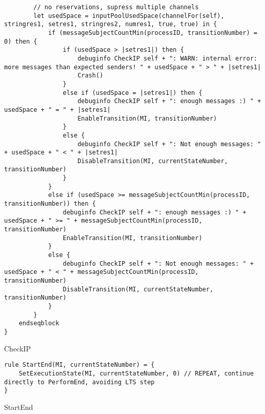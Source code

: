 \begin{listing}[H]
\begin{verbatim}
        // no reservations, supress multiple channels
        let usedSpace = inputPoolUsedSpace(channelFor(self), stringres1, setres1, stringres2, numres1, true, true) in {
            if (messageSubjectCountMin(processID, transitionNumber) = 0) then {
                if (usedSpace > |setres1|) then {
                    debuginfo CheckIP self + ": WARN: internal error: more messages than expected senders! " + usedSpace + " > " + |setres1|
                    Crash()
                }
                else if (usedSpace = |setres1|) then {
                    debuginfo CheckIP self + ": enough messages :) " + usedSpace + " = " + |setres1|
                    EnableTransition(MI, transitionNumber)
                }
                else {
                    debuginfo CheckIP self + ": Not enough messages: " + usedSpace + " < " + |setres1|
                    DisableTransition(MI, currentStateNumber, transitionNumber)
                }
            }
            else if (usedSpace >= messageSubjectCountMin(processID, transitionNumber)) then {
                debuginfo CheckIP self + ": enough messages :) " + usedSpace + " >= " + messageSubjectCountMin(processID, transitionNumber)
                EnableTransition(MI, transitionNumber)
            }
            else {
                debuginfo CheckIP self + ": Not enough messages: " + usedSpace + " < " + messageSubjectCountMin(processID, transitionNumber)
                DisableTransition(MI, currentStateNumber, transitionNumber)
            }
        }
    endseqblock
}
\end{verbatim}
\caption{CheckIP}
\label{lst:asm:CheckIP}
\end{listing}





\begin{listing}[H]
\begin{verbatim}
rule StartEnd(MI, currentStateNumber) = {
    SetExecutionState(MI, currentStateNumber, 0) // REPEAT, continue directly to PerformEnd, avoiding LTS step
}
\end{verbatim}
\caption{StartEnd}
\label{lst:asm:StartEnd}
\end{listing}




